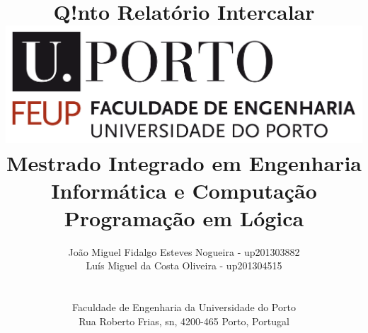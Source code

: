 \documentclass[a4paper]{article}
\begin{document}
	
	\setlength{\textwidth}{16cm}
	\setlength{\textheight}{22cm}
	
	\title{\Huge\textbf{Q!nto}\linebreak\linebreak\linebreak
	\Large\textbf{Relatório Intercalar}\linebreak\linebreak
	\linebreak\linebreak
	\includegraphics[scale=0.1]{feup-logo.png}\linebreak\linebreak
	\linebreak\linebreak
	\Large{Mestrado Integrado em Engenharia Informática e Computação} \linebreak\linebreak
	\Large{Programação em Lógica}\linebreak
		}
	
	\author{
	João Miguel Fidalgo Esteves Nogueira - up201303882 \\
	Luís Miguel da Costa Oliveira - up201304515 \\
	\linebreak\linebreak \\
	 \\ Faculdade de Engenharia da Universidade do Porto \\ Rua Roberto Frias, s\/n, 4200-465 Porto, Portugal \linebreak\linebreak\linebreak
	\linebreak\linebreak\vspace{1cm}}
	
	\maketitle
	\thispagestyle{empty}
	
\end{document}
